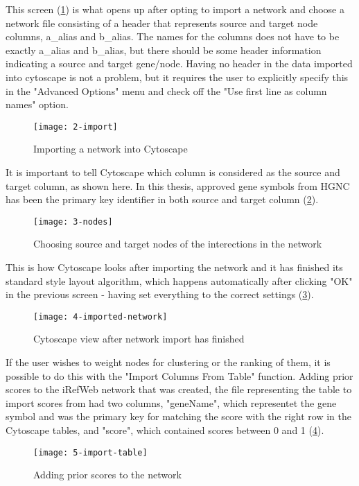 This screen (\ref{fig:import}) is what opens up after opting to import a network
and choose a network file consisting of a header that represents source and
target node columns, a\_alias and b\_alias. The names for the columns does not
have to be exactly a\_alias and b\_alias, but there should be some header
information indicating a source and target gene/node. Having no header in the
data imported into cytoscape is not a problem, but it requires the user to
explicitly specify this in the "Advanced Options" menu and check off the "Use
first line as column names" option.
\begin{figure}[H]
    \texttt{[image: 2-import]}
    \caption{Importing a network into Cytoscape}
    \label{fig:import}
\end{figure}

It is important to tell Cytoscape which column is considered as the source and
target column, as shown here. In this thesis, approved gene symbols from HGNC
has been the primary key identifier in both source and target column
(\ref{fig:nodes}).
\begin{figure}[H]
    \texttt{[image: 3-nodes]}
    \caption{Choosing source and target nodes of the interections in the network}
    \label{fig:nodes}
\end{figure}

This is how Cytoscape looks after importing the network and it has finished its
standard style layout algorithm, which happens automatically after clicking "OK"
in the previous screen - having set everything to the correct settings
(\ref{fig:imported-network}).
\begin{figure}[H]
    \texttt{[image: 4-imported-network]}
    \caption{Cytoscape view after network import has finished}
    \label{fig:imported-network}
\end{figure}

If the user wishes to weight nodes for clustering or the ranking of them, it is
possible to do this with the "Import Columns From Table" function. Adding prior
scores to the iRefWeb network that was created, the file representing the table
to import scores from had two columns, "geneName", which representet the gene
symbol and was the primary key for matching the score with the right row in the
Cytoscape tables, and "score", which contained scores between 0 and 1
(\ref{fig:import-table}).
\begin{figure}[H]
    \texttt{[image: 5-import-table]}
    \caption{Adding prior scores to the network}
    \label{fig:import-table}
\end{figure}

